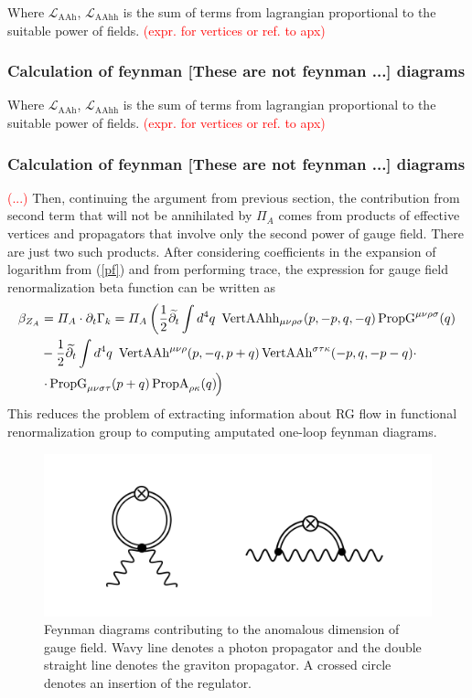 \documentclass[11pt, a4paper]{article}
\newcommand{\jhkbf}[1]{\textbf{\color{red} [#1]}}
\newcommand{\jhkbf}[1]{\textbf{\color{red} [#1]}}
\begin{document}
Where $\mathcal{L}_{\text{AAh}}$, $\mathcal{L}_{\text{AAhh}}$ is the sum of terms from lagrangian proportional to the suitable power of fields.
\textcolor{red}{(expr. for vertices or ref. to apx)}
 
\subsubsection{Calculation of feynman \jhkbf{These are not feynman ...} diagrams}
Where $\mathcal{L}_{\text{AAh}}$, $\mathcal{L}_{\text{AAhh}}$ is the sum of terms from lagrangian proportional to the suitable power of fields.
\textcolor{red}{(expr. for vertices or ref. to apx)}
 
\subsubsection{Calculation of feynman \jhkbf{These are not feynman ...} diagrams}
\textcolor{red}{(...)} Then, continuing the argument from previous section, the contribution from second term that will not be annihilated
by $\varPi_A$ comes from products of effective vertices and propagators that involve only the second power of gauge field.
There are just two such products. After considering coefficients in the expansion of logarithm from (\ref{pf}) and from performing trace, the expression for gauge field renormalization beta function can be written as
\begin{align}
    \beta_{Z_A} & = \varPi_A \cdot \partial_t \Gamma_k = \varPi_A \left( \frac{1}{2} \widetilde{\partial_t} \int d^4 q \ \operatorname{VertAAhh}_{\mu\nu\rho\sigma}(p,-p,q,-q) \operatorname{PropG}^{\mu\nu\rho\sigma}(q)\right.\\
    & - \frac{1}{2} \widetilde{\partial_t} \int d^4 q \ \operatorname{VertAAh}^{\mu\nu\rho}(p,-q,p+q) \operatorname{VertAAh}^{\sigma\tau\kappa}(-p,q,-p-q) \cdot \\
    &\left. \cdot \operatorname{PropG}_{\mu\nu\sigma\tau}(p+q) \operatorname{PropA}_{\rho\kappa}(q) \phantom{\frac{}{}} \hspace{-0.35em}\right)
\end{align}
This reduces the problem of extracting information about RG flow in functional renormalization group to computing amputated one-loop feynman diagrams.
\begin{figure}[H]
    \includegraphics[width=1\textwidth]{./figures/diags.png}
    \caption{Feynman diagrams contributing to the anomalous dimension of gauge field. Wavy line denotes a photon propagator
    and the double straight line denotes the graviton propagator. A crossed circle denotes an insertion of the regulator.}
    \label{diags}
\end{figure} 
\end{document}
